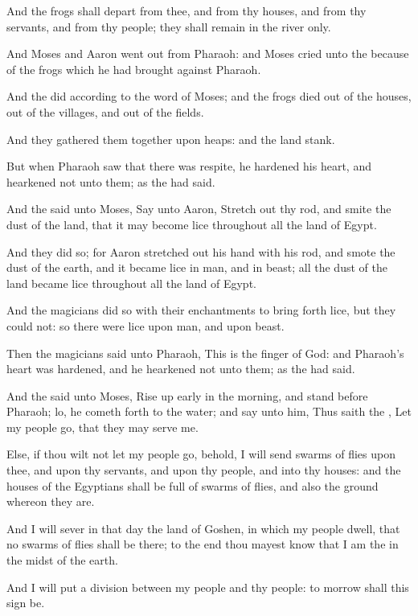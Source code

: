 \verse And the frogs shall depart from thee, and from thy houses, and
from thy servants, and from thy people; they shall remain in the river
only.

\verse And Moses and Aaron went out from Pharaoh: and Moses cried unto
the \LORD because of the frogs which he had brought against Pharaoh.

\verse And the \LORD did according to the word of Moses; and the frogs
died out of the houses, out of the villages, and out of the fields.

\verse And they gathered them together upon heaps: and the land stank.

\verse But when Pharaoh saw that there was respite, he hardened his
heart, and hearkened not unto them; as the \LORD had said.

\verse And the \LORD said unto Moses, Say unto Aaron, Stretch out thy
rod, and smite the dust of the land, that it may become lice
throughout all the land of Egypt.

\verse And they did so; for Aaron stretched out his hand with his rod,
and smote the dust of the earth, and it became lice in man, and in
beast; all the dust of the land became lice throughout all the land of
Egypt.

\verse And the magicians did so with their enchantments to bring forth
lice, but they could not: so there were lice upon man, and upon beast.

\verse Then the magicians said unto Pharaoh, This is the finger of God:
and Pharaoh's heart was hardened, and he hearkened not unto them; as
the \LORD had said.

\verse And the \LORD said unto Moses, Rise up early in the morning, and
stand before Pharaoh; lo, he cometh forth to the water; and say unto
him, Thus saith the \LORD, Let my people go, that they may serve me.

\verse Else, if thou wilt not let my people go, behold, I will send
swarms of flies upon thee, and upon thy servants, and upon thy people,
and into thy houses: and the houses of the Egyptians shall be full of
swarms of flies, and also the ground whereon they are.

\verse And I will sever in that day the land of Goshen, in which my
people dwell, that no swarms of flies shall be there; to the end thou
mayest know that I am the \LORD in the midst of the earth.

\verse And I will put a division between my people and thy people: to
morrow shall this sign be.


